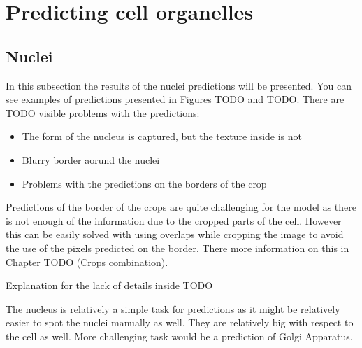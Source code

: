 \section{Predicting cell organelles}
\subsection{Nuclei}
In this subsection the results of the nuclei predictions will be presented. You can see examples of predictions presented in Figures TODO and TODO. There are TODO visible problems with the predictions:
\begin{itemize}
    \item The form of the nucleus is captured, but the texture inside is not
    \item Blurry border aorund the nuclei
    \item Problems with the predictions on the borders of the crop
\end{itemize}
Predictions of the border of the crops are quite challenging for the model as there is not enough of the information due to the cropped parts of the cell. However this can be easily solved with using overlaps while cropping the image to avoid the use of the pixels predicted on the border. There more information on this in Chapter TODO (Crops combination).

Explanation for the lack of details inside TODO

The nucleus is relatively a simple task for predictions as it might be relatively easier to spot the nuclei manually as well. They are relatively big with respect to the cell as well. More challenging task would be a prediction of Golgi Apparatus.
